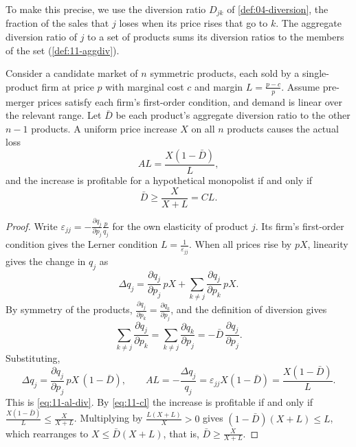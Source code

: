 To make this precise, we use the diversion ratio $D_{jk}$ of \cref{def:04-diversion}, the fraction of the sales that
$j$ loses when its price rises that go to $k$. The aggregate diversion ratio of $j$ to a set of products sums its
diversion ratios to the members of the set (\cref{def:11-aggdiv}).

\begin{proposition}\label{prop:11-aggdiv}
Consider a candidate market of $n$ symmetric products, each sold by a single-product firm at price $p$ with
marginal cost $c$ and margin $L = \frac{p - c}{p}$. Assume pre-merger prices satisfy each firm's first-order
condition, and demand is linear over the relevant range. Let $\bar D$ be each product's aggregate diversion
ratio to the other $n - 1$ products. A uniform price increase $X$ on all $n$ products causes the actual loss
\begin{equation}\label{eq:11-al-div}
\mathit{AL} = \frac{X(1 - \bar D)}{L},
\end{equation}
and the increase is profitable for a hypothetical monopolist if and only if
\begin{equation}\label{eq:11-aggdiv}
\bar D \ge \frac{X}{X + L} = \mathit{CL}.
\end{equation}
\end{proposition}

\begin{proof}
Write $\varepsilon_{jj} = -\frac{\partial q_j}{\partial p_j}\frac{p}{q_j}$ for the own elasticity of product $j$.
Its firm's first-order condition gives the Lerner condition $L = \frac{1}{\varepsilon_{jj}}$. When all prices rise
by $pX$, linearity gives the change in $q_j$ as
\begin{equation*}
\Delta q_j = \frac{\partial q_j}{\partial p_j}\,pX + \sum_{k \ne j}\frac{\partial q_j}{\partial p_k}\,pX.
\end{equation*}
By symmetry of the products, $\frac{\partial q_j}{\partial p_k} = \frac{\partial q_k}{\partial p_j}$, and the
definition of diversion gives
\begin{equation*}
\sum_{k \ne j}\frac{\partial q_j}{\partial p_k} = \sum_{k \ne j}\frac{\partial q_k}{\partial p_j}
= -\bar D\,\frac{\partial q_j}{\partial p_j}.
\end{equation*}
Substituting,
\begin{equation*}
\Delta q_j = \frac{\partial q_j}{\partial p_j}\,pX\,(1 - \bar D),
\qquad
\mathit{AL} = -\frac{\Delta q_j}{q_j} = \varepsilon_{jj}X(1 - \bar D) = \frac{X(1 - \bar D)}{L}.
\end{equation*}
This is \eqref{eq:11-al-div}. By \eqref{eq:11-cl} the increase is profitable if and only if
$\frac{X(1 - \bar D)}{L} \le \frac{X}{X + L}$. Multiplying by $\frac{L(X + L)}{X} > 0$ gives
$(1 - \bar D)(X + L) \le L$, which rearranges to $X \le \bar D(X + L)$, that is, $\bar D \ge \frac{X}{X + L}$.
\end{proof}

